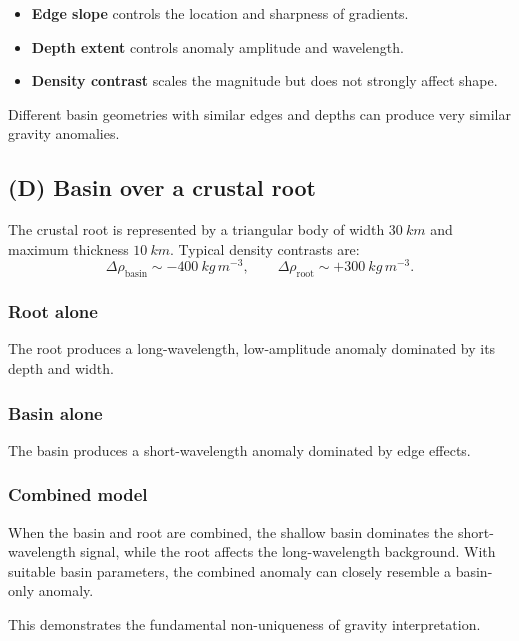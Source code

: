 \documentclass[11pt,a4paper]{article}
\begin{document}
\begin{itemize}
    \item \textbf{Edge slope} controls the location and sharpness of gradients.
    \item \textbf{Depth extent} controls anomaly amplitude and wavelength.
    \item \textbf{Density contrast} scales the magnitude but does not strongly affect shape.
\end{itemize}

Different basin geometries with similar edges and depths can produce very similar
gravity anomalies.

\subsection*{(D) Basin over a crustal root}

The crustal root is represented by a triangular body of width $\SI{30}{km}$ and
maximum thickness $\SI{10}{km}$. Typical density contrasts are:
\[
\Delta\rho_{\text{basin}} \sim -400~\si{kg\,m^{-3}}, \qquad
\Delta\rho_{\text{root}} \sim +300~\si{kg\,m^{-3}}.
\]

\subsubsection*{Root alone}

The root produces a long-wavelength, low-amplitude anomaly dominated by its depth
and width.

\subsubsection*{Basin alone}

The basin produces a short-wavelength anomaly dominated by edge effects.

\subsubsection*{Combined model}

When the basin and root are combined, the shallow basin dominates the short-wavelength
signal, while the root affects the long-wavelength background. With suitable basin
parameters, the combined anomaly can closely resemble a basin-only anomaly.

This demonstrates the fundamental non-uniqueness of gravity interpretation.
\end{document}
